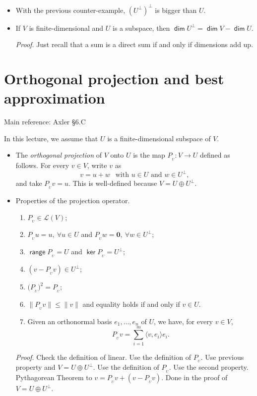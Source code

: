 \documentclass[11pt]{article}
\newcommand{\1}{\mathbf{1}}
\newcommand{\proj}[1]{P_{\!\!{}_{#1}}}
\newcommand{\0}{\mathbf{0}}
\DeclareMathOperator{\myrange}{\mathsf{range}}
\DeclareMathOperator{\myker}{\mathsf{ker}}
\DeclareMathOperator{\mydim}{\mathsf{dim}}
\renewcommand{\leq}{\leqslant}
\newcommand{\spitem}{\item[$\circ$]}
\begin{document}
{\begin{itemize}
\spitem

With the previous counter-example, $(U^\perp)^\perp$ is bigger than $U$.

\item

If $V$ is finite-dimensional and $U$ is a subspace, then $\mydim U^\perp = \mydim V - \mydim U$.

\emph{Proof.}
Just recall that a sum is a direct sum if and only if dimensions add up.

\end{itemize}


\clearpage
\section{Orthogonal projection and best approximation}

Main reference:
Axler \S6.C

In this lecture, we assume that $U$ is a finite-dimensional subspace of $V$.

\begin{itemize}

\item

The \emph{orthogonal projection} of $V$ onto $U$ is the map $\proj{U} : V \to U$ defined as follows.
For every $v\in V$, write $v$ as
$$v=u+w \ \ \text{ with } u\in U \text{ and } w\in U^\perp,$$
and take $\proj{U} v=u$.
This is well-defined because $V=U\oplus U^\perp$.

\item

Properties of the projection operator.
\begin{enumerate}
\item $\proj{U}\in\mathcal{L}(V)$;
\item $\proj{U} u=u,\ \forall u\in U$ and $\proj{U} w=\0, \ \forall w\in U^\perp$;
\item $\myrange \proj{U}=U$ and $\myker \proj{U}=U^\perp$;
\item $(v - \proj{U} v )\in U^\perp$;
\item $\big(\proj{U}\big)^2=\proj{U}$;
\item $\|\proj{U} v\|\leq \|v\|$ and equality holds if and only if $v\in U$.
\item Given an orthonormal basis $e_1,\dots,e_n$ of $U$, we have, for every $v\in V$,
$$\proj{U} v = \sum_{i=1}^m\langle v,e_i\rangle e_i.$$
\end{enumerate}
\emph{Proof.}
Check the definition of linear.
Use the definition of $\proj{U}$.
Use previous property and $V=U\oplus U^\perp$.
Use the definition of $\proj{U}$.
Use the second property.
Pythagorean Theorem to $v=\proj{U} v + (v - \proj{U} v)$.
Done in the proof of $V=U\oplus U^\perp$.


\end{itemize}}
\end{document}
